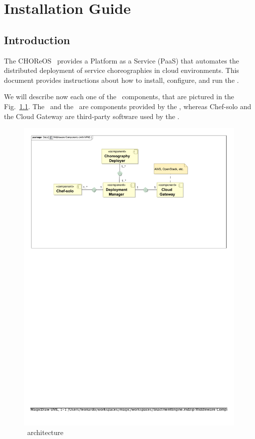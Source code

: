
\chapter{Installation Guide}

\section{Introduction}

The CHOReOS \ee\ provides a Platform as a Service (PaaS) that automates the distributed deployment of service choreographies in cloud environments. This document provides instructions about how to install, configure, and run the \ee.

We will describe now each one of the \ee\ components, that are pictured in the Fig.~\ref{fig:ee_components}. The \cd\ and the \dm\ are components provided by the \ee, whereas Chef-solo and the Cloud Gateway are third-party software used by the \ee.

\begin{figure}
\centering
\includegraphics[scale=0.8]{img/components.pdf}
\caption{\ee\ architecture}
\label{fig:ee_components}
\end{figure}

